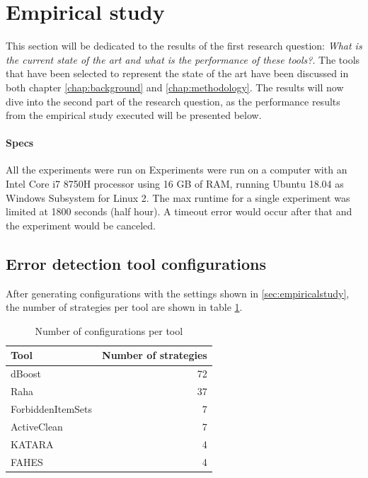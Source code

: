 \section{Empirical study}
This section will be dedicated to the results of the first research question: \textit{What is the current state of the art and what is the performance
of these tools?}. The tools that have been selected to represent the state of the art have been discussed in both chapter \ref{chap:background} and \ref{chap:methodology}. The results will now dive into the second part of the research question, as the performance results from the empirical study executed will be presented below. 

\paragraph{Specs}
All the experiments were run on 
Experiments were run on a computer with an Intel Core i7 8750H processor using 16 GB of RAM, running Ubuntu 18.04 as Windows Subsystem for Linux 2. %
The max runtime for a single experiment was limited at 1800 seconds (half hour). A timeout error would occur after that and the experiment would be canceled. 

\subsection{Error detection tool configurations}
After generating configurations with the settings shown in \ref{sec:empiricalstudy}, the number of strategies per tool are shown in table \ref{tab:number_configs_tool}. 

\begin{table}[H]
\centering
\begin{tabular}{lr}
\toprule
Tool &  Number of strategies \\
\midrule
dBoost            &                  72 \\
Raha              &                  37 \\
ForbiddenItemSets &                   7 \\
ActiveClean       &                   7 \\
KATARA            &                   4 \\
FAHES             &                   4 \\
\bottomrule
\end{tabular}
\caption{Number of configurations per tool}
\label{tab:number_configs_tool}
\end{table}

